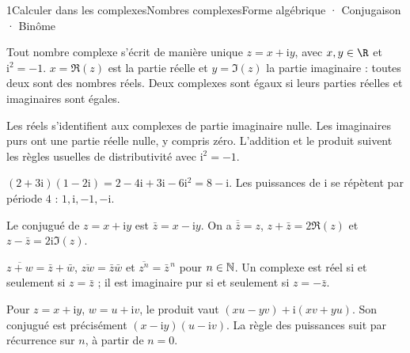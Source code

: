 \begin{ouverture}[courbe]{1}{Calculer dans les complexes}{Nombres complexes}{Forme algébrique · Conjugaison · Binôme}
\end{ouverture}
\essentiel

\begin{definition}
Tout nombre complexe s'écrit de manière unique $z=x+\mathrm iy$, avec $x,y\in\R$ et $\mathrm i^2=-1$.
$x=\Re(z)$ est la partie réelle et $y=\Im(z)$ la partie imaginaire : toutes deux sont des nombres réels.
Deux complexes sont égaux si leurs parties réelles et imaginaires sont égales.
\end{definition}
Les réels s'identifient aux complexes de partie imaginaire nulle. Les imaginaires purs ont une partie réelle nulle, y compris zéro.
L'addition et le produit suivent les règles usuelles de distributivité avec $\mathrm i^2=-1$.
\begin{exemple}
$(2+3\mathrm i)(1-2\mathrm i)=2-4\mathrm i+3\mathrm i-6\mathrm i^2=8-\mathrm i$.
Les puissances de $\mathrm i$ se répètent par période $4$ : $1,\mathrm i,-1,-\mathrm i$.
\end{exemple}
\begin{definition}
Le conjugué de $z=x+\mathrm iy$ est $\bar z=x-\mathrm iy$.
On a $\overline{\bar z}=z$, $z+\bar z=2\Re(z)$ et $z-\bar z=2\mathrm i\Im(z)$.
\end{definition}
\begin{propriete}
$\overline{z+w}=\bar z+\bar w$, $\overline{zw}=\bar z\bar w$ et $\overline{z^n}=\bar z^{\,n}$ pour $n\in\mathbb{N}$.
Un complexe est réel si et seulement si $z=\bar z$ ; il est imaginaire pur si et seulement si $z=-\bar z$.
\end{propriete}
\begin{demonstration}
Pour $z=x+\mathrm iy$, $w=u+\mathrm iv$, le produit vaut $(xu-yv)+\mathrm i(xv+yu)$. Son conjugué est précisément $(x-\mathrm iy)(u-\mathrm iv)$. La règle des puissances suit par récurrence sur $n$, à partir de $n=0$.
\end{demonstration}
